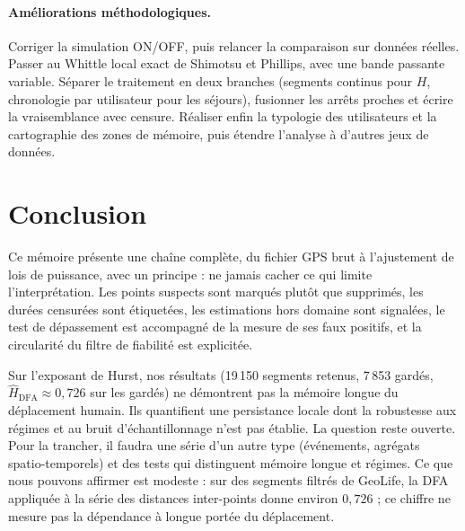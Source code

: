 \documentclass[11pt,a4paper]{article}
\renewcommand{\_}{\textunderscore\penalty0\hspace{0pt}}
\begin{document}
\paragraph{Améliorations méthodologiques.} Corriger la simulation ON/OFF, puis relancer la
comparaison sur données réelles. Passer au Whittle local exact de Shimotsu et Phillips, avec
une bande passante variable. Séparer le traitement en deux branches (segments continus pour
$H$, chronologie par utilisateur pour les séjours), fusionner les arrêts proches et écrire
la vraisemblance avec censure. Réaliser enfin la typologie des utilisateurs et la
cartographie des zones de mémoire, puis étendre l'analyse à d'autres jeux de données.

\section{Conclusion}
\label{sec:conclusion}

Ce mémoire présente une chaîne complète, du fichier GPS brut à l'ajustement de lois de
puissance, avec un principe : ne jamais cacher ce qui limite l'interprétation. Les points
suspects sont marqués plutôt que supprimés, les durées censurées sont étiquetées, les
estimations hors domaine sont signalées, le test de dépassement est accompagné de la mesure
de ses faux positifs, et la circularité du filtre de fiabilité est explicitée.

Sur l'exposant de Hurst, nos résultats (19\,150 segments retenus, 7\,853 gardés,
$\hat H_{\mathrm{DFA}}\approx 0{,}726$ sur les gardés) ne démontrent pas la mémoire longue du
déplacement humain. Ils quantifient une persistance locale dont la robustesse aux régimes et
au bruit d'échantillonnage n'est pas établie. La question reste ouverte. Pour la trancher,
il faudra une série d'un autre type (événements, agrégats spatio-temporels) et des tests qui
distinguent mémoire longue et régimes. Ce que nous pouvons affirmer est modeste : sur des
segments filtrés de GeoLife, la DFA appliquée à la série des distances inter-points donne
environ $0{,}726$ ; ce chiffre ne mesure pas la dépendance à longue portée du déplacement.
\end{document}
